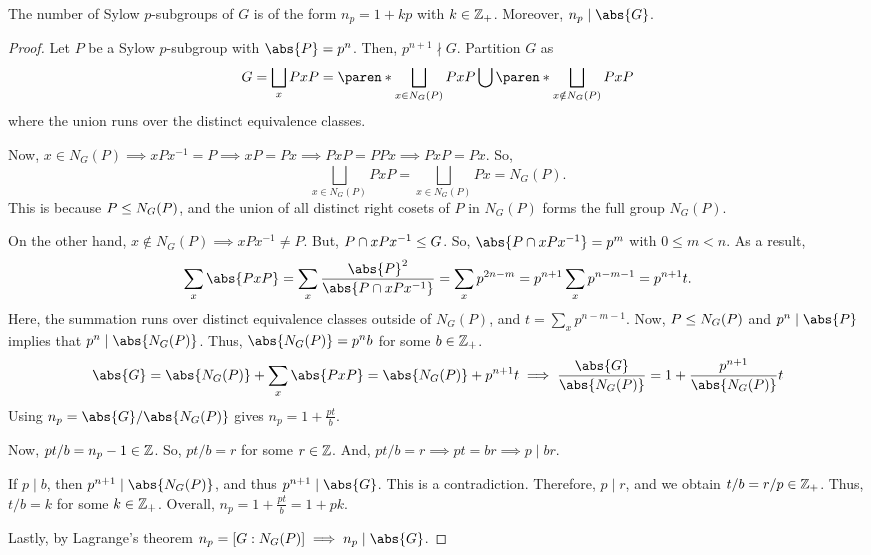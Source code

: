 \documentclass[11pt]{penrose}
\begin{document}
\begin{nthm}
    The number of Sylow $p$-subgroups of $G$ is of the form $n_{p} = 1 + kp$ with $k \in \mathbb{Z}_{+}$. Moreover, $n_{p} \mid \abs{G}$.
\end{nthm}
\begin{proof}
    Let $P$ be a Sylow $p$-subgroup with $\abs{P} = p^{n}$. Then, $p^{n+1} \nmid G$. Partition $G$ as
    \begin{equation*}
        G
        = \bigsqcup_{x} PxP
        = \paren*{\bigsqcup_{x \in N_{G}(P)} PxP} \bigcup \paren*{\bigsqcup_{x \notin N_{G}(P)} PxP}
    \end{equation*}
    where the union runs over the distinct equivalence classes.

    Now, $x \in N_{G}(P) \implies xPx^{-1} = P \implies xP = Px \implies PxP = PPx \implies PxP = Px$. So,
    \begin{equation*}
        \bigsqcup_{x \in N_{G}(P)} PxP
        = \bigsqcup_{x \in N_{G}(P)} Px
        = N_{G}(P).
    \end{equation*}
    This is because $P \mathrel{\leq} N_{G}(P)$, and the union of all distinct right cosets of $P$ in $N_{G}(P)$ forms the full group $N_{G}(P)$.

    On the other hand, $x \notin N_{G}(P) \implies xPx^{-1} \neq P$. But, $P \cap xPx^{-1} \mathrel{\leq} G$. So, $\abs{P \cap xPx^{-1}} = p^{m}$ with $0 \leq m < n$. As a result,
    \begin{equation*}
        \sum_{x} \abs{PxP}
        = \sum_{x} \frac{\abs{P}^{2}}{\abs{P \cap xPx^{-1}}}
        = \sum_{x} p^{2n-m}
        = p^{n+1} \sum_{x} p^{n-m-1}
        = p^{n+1} t.
    \end{equation*}
    Here, the summation runs over distinct equivalence classes outside of $N_{G}(P)$, and $t = \sum_{x} p^{n-m-1}$. Now, $P \mathrel{\leq} N_{G}(P)$ and $p^{n} \mid \abs{P}$ implies that $p^{n} \mid \abs{N_{G}(P)}$. Thus, $\abs{N_{G}(P)} = p^{n}b$ for some $b \in \mathbb{Z}_{+}$.
    \begin{equation*}
        \abs{G}
        = \abs{N_{G}(P)} + \sum_{x} \abs{PxP}
        = \abs{N_{G}(P)} + p^{n+1} t
        \implies
        \frac{\abs{G}}{\abs{N_{G}(P)}} = 1 + \frac{p^{n+1}}{\abs{N_{G}(P)}} t
    \end{equation*}
    Using $n_{p} = \abs{G}/\abs{N_{G}(P)}$ gives $\displaystyle n_{p} = 1 + \frac{pt}{b}$.

    Now, $pt/b = n_{p} - 1 \in \mathbb{Z}$. So, $pt/b = r$ for some $r \in \mathbb{Z}$. And, $pt/b = r \implies pt = br \implies p \mid br$.

    If $p \mid b$, then $p^{n+1} \mid \abs{N_{G}(P)}$, and thus $p^{n+1} \mid \abs{G}$. This is a contradiction. Therefore, $p \mid r$, and we obtain $t/b = r/p \in \mathbb{Z}_{+}$. Thus, $t/b = k$ for some $k \in \mathbb{Z}_{+}$. Overall, $\displaystyle n_{p} = 1 + \frac{pt}{b} = 1 + pk$.

    Lastly, by Lagrange's theorem $n_{p} = [G : N_{G}(P)] \implies n_{p} \mid \abs{G}$.
\end{proof}
\end{document}
